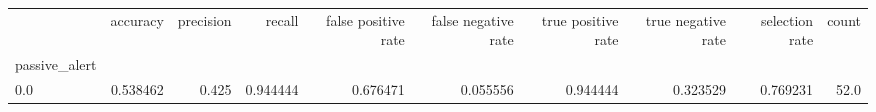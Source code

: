 \begin{tabular}{lrrrrrrrrr}
\toprule
{} &  accuracy &  precision &    recall &  false positive rate &  false negative rate &  true positive rate &  true negative rate &  selection rate &  count \\
passive\_alert &           &            &           &                      &                      &                     &                     &                 &        \\
\midrule
0.0           &  0.538462 &      0.425 &  0.944444 &             0.676471 &             0.055556 &            0.944444 &            0.323529 &        0.769231 &   52.0 \\
\bottomrule
\end{tabular}

